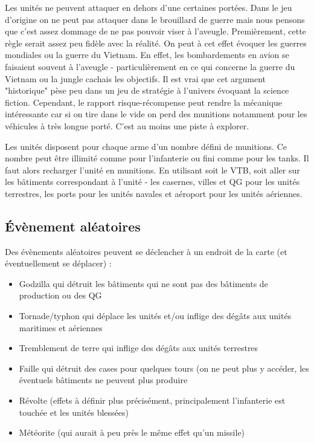 \documentclass[a4paper,10pt]{article} %
\begin{document}
Les unités ne peuvent attaquer en dehors d'une certaines portées. Dans le jeu d'origine on ne peut pas attaquer dans le brouillard de guerre mais nous pensons que c'est assez dommage de ne pas pouvoir viser à l'aveugle. Premièrement, cette règle serait assez peu fidèle avec la réalité. On peut à cet effet évoquer les guerres mondiales ou la guerre du Vietnam. En effet, les bombardements en avion se faisaient souvent à l'aveugle - particulièrement en ce qui concerne la guerre du Vietnam ou la jungle cachais les objectifs. Il est vrai que cet argument "historique" pèse peu dans un jeu de stratégie à l'univers évoquant la science fiction. Cependant, le rapport risque-récompense peut rendre la mécanique intéressante car si on tire dans le vide on perd des munitions notamment pour les véhicules à très longue porté. C'est au moins une piste à explorer.


Les unités disposent pour chaque arme d'un nombre défini de munitions. Ce nombre peut être illimité comme pour l'infanterie ou fini comme pour les tanks. Il faut alors recharger l'unité en munitions. En utilisant soit le VTB, soit aller sur les bâtiments correspondant à l'unité - les casernes, villes et QG pour les unités terrestres, les ports pour les unités navales et aéroport pour les unités aériennes.


\subsection{Évènement aléatoires}
Des évènements aléatoires peuvent se déclencher à un endroit de la carte (et éventuellement se déplacer) :\\

\begin{itemize}
\item Godzilla qui détruit les bâtiments qui ne sont pas des bâtiments de production ou des QG
\item Tornade/typhon qui déplace les unités et/ou inflige des dégâts aux unités maritimes et aériennes
\item Tremblement de terre qui inflige des dégâts aux unités terrestres
\item Faille qui détruit des cases pour quelques tours (on ne peut plus y accéder, les éventuels bâtiments ne peuvent plus produire
\item Révolte (effets à définir plus précisément, principalement l'infanterie est touchée et les unités blessées)
\item Météorite (qui aurait à peu près le même effet qu'un missile)
\end{itemize}
\end{document}
